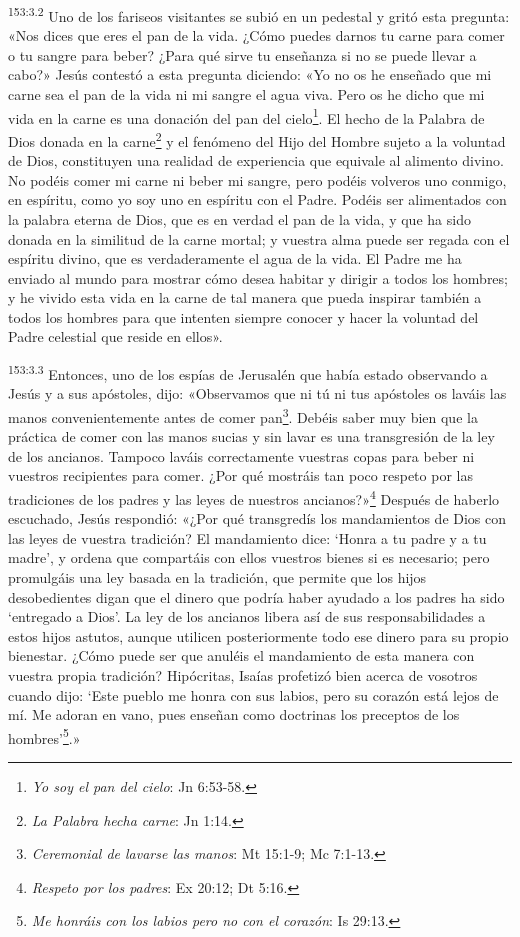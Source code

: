 \par 
\textsuperscript{153:3.2} Uno de los fariseos visitantes se subió en un pedestal y gritó esta pregunta: «Nos dices que eres el pan de la vida. ¿Cómo puedes darnos tu carne para comer o tu sangre para beber? ¿Para qué sirve tu enseñanza si no se puede llevar a cabo?» Jesús contestó a esta pregunta diciendo: «Yo no os he enseñado que mi carne sea el pan de la vida ni mi sangre el agua viva. Pero os he dicho que mi vida en la carne es una donación del pan del cielo\footnote{\textit{Yo soy el pan del cielo}: Jn 6:53-58.}. El hecho de la Palabra de Dios donada en la carne\footnote{\textit{La Palabra hecha carne}: Jn 1:14.} y el fenómeno del Hijo del Hombre sujeto a la voluntad de Dios, constituyen una realidad de experiencia que equivale al alimento divino. No podéis comer mi carne ni beber mi sangre, pero podéis volveros uno conmigo, en espíritu, como yo soy uno en espíritu con el Padre. Podéis ser alimentados con la palabra eterna de Dios, que es en verdad el pan de la vida, y que ha sido donada en la similitud de la carne mortal; y vuestra alma puede ser regada con el espíritu divino, que es verdaderamente el agua de la vida. El Padre me ha enviado al mundo para mostrar cómo desea habitar y dirigir a todos los hombres; y he vivido esta vida en la carne de tal manera que pueda inspirar también a todos los hombres para que intenten siempre conocer y hacer la voluntad del Padre celestial que reside en ellos».

\par 
\textsuperscript{153:3.3} Entonces, uno de los espías de Jerusalén que había estado observando a Jesús y a sus apóstoles, dijo: «Observamos que ni tú ni tus apóstoles os laváis las manos convenientemente antes de comer pan\footnote{\textit{Ceremonial de lavarse las manos}: Mt 15:1-9; Mc 7:1-13.}. Debéis saber muy bien que la práctica de comer con las manos sucias y sin lavar es una transgresión de la ley de los ancianos. Tampoco laváis correctamente vuestras copas para beber ni vuestros recipientes para comer. ¿Por qué mostráis tan poco respeto por las tradiciones de los padres y las leyes de nuestros ancianos?»\footnote{\textit{Respeto por los padres}: Ex 20:12; Dt 5:16.} Después de haberlo escuchado, Jesús respondió: «¿Por qué transgredís los mandamientos de Dios con las leyes de vuestra tradición? El mandamiento dice: `Honra a tu padre y a tu madre', y ordena que compartáis con ellos vuestros bienes si es necesario; pero promulgáis una ley basada en la tradición, que permite que los hijos desobedientes digan que el dinero que podría haber ayudado a los padres ha sido `entregado a Dios'. La ley de los ancianos libera así de sus responsabilidades a estos hijos astutos, aunque utilicen posteriormente todo ese dinero para su propio bienestar. ¿Cómo puede ser que anuléis el mandamiento de esta manera con vuestra propia tradición? Hipócritas, Isaías profetizó bien acerca de vosotros cuando dijo: `Este pueblo me honra con sus labios, pero su corazón está lejos de mí. Me adoran en vano, pues enseñan como doctrinas los preceptos de los hombres'\footnote{\textit{Me honráis con los labios pero no con el corazón}: Is 29:13.}.»

